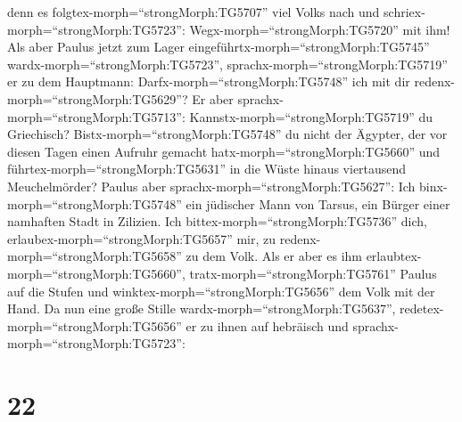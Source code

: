 denn es folgtex-morph=``strongMorph:TG5707'' viel Volks nach und
schriex-morph=``strongMorph:TG5723'': Wegx-morph=``strongMorph:TG5720''
mit ihm!  Als aber Paulus jetzt zum Lager
eingeführtx-morph=``strongMorph:TG5745''
wardx-morph=``strongMorph:TG5723'', sprachx-morph=``strongMorph:TG5719''
er zu dem Hauptmann: Darfx-morph=``strongMorph:TG5748'' ich mit dir
redenx-morph=``strongMorph:TG5629''? Er aber
sprachx-morph=``strongMorph:TG5713'':
Kannstx-morph=``strongMorph:TG5719'' du Griechisch? 
Bistx-morph=``strongMorph:TG5748'' du nicht der Ägypter, der vor diesen
Tagen einen Aufruhr gemacht hatx-morph=``strongMorph:TG5660'' und
führtex-morph=``strongMorph:TG5631'' in die Wüste hinaus viertausend
Meuchelmörder?  Paulus aber
sprachx-morph=``strongMorph:TG5627'': Ich
binx-morph=``strongMorph:TG5748'' ein jüdischer Mann von Tarsus, ein
Bürger einer namhaften Stadt in Zilizien. Ich
bittex-morph=``strongMorph:TG5736'' dich,
erlaubex-morph=``strongMorph:TG5657'' mir, zu
redenx-morph=``strongMorph:TG5658'' zu dem Volk.  Als er
aber es ihm erlaubtex-morph=``strongMorph:TG5660'',
tratx-morph=``strongMorph:TG5761'' Paulus auf die Stufen und
winktex-morph=``strongMorph:TG5656'' dem Volk mit der Hand. Da nun eine
große Stille wardx-morph=``strongMorph:TG5637'',
redetex-morph=``strongMorph:TG5656'' er zu ihnen auf hebräisch und
sprachx-morph=``strongMorph:TG5723'':

\hypertarget{section-21}{%
\section{22}\label{section-21}}

